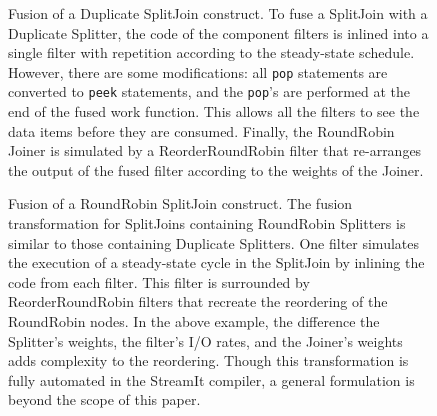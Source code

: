 \begin{figure}
\centering
{}
\caption{\protect\small Fusion of a Duplicate SplitJoin construct.  To
fuse a SplitJoin with a Duplicate Splitter, the code of the component
filters is inlined into a single filter with repetition according to
the steady-state schedule.  However, there are some modifications: all
{\tt pop} statements are converted to {\tt peek} statements, and the
{\tt pop}'s are performed at the end of the fused work function.  This
allows all the filters to see the data items before they are consumed.
Finally, the RoundRobin Joiner is simulated by a ReorderRoundRobin
filter that re-arranges the output of the fused filter according to
the weights of the Joiner.  \protect\label{fig:fuse-splitjoin1}}
\vspace{18pt}
\caption{\protect\small Fusion of a RoundRobin SplitJoin construct.
The fusion transformation for SplitJoins containing RoundRobin
Splitters is similar to those containing Duplicate Splitters.  One
filter simulates the execution of a steady-state cycle in the
SplitJoin by inlining the code from each filter.  This filter is
surrounded by ReorderRoundRobin filters that recreate the reordering of
the RoundRobin nodes.  In the above example, the difference the
Splitter's weights, the filter's I/O rates, and the Joiner's weights
adds complexity to the reordering.  Though this transformation is
fully automated in the StreamIt compiler, a general formulation is
beyond the scope of this paper.  \protect\label{fig:fuse-splitjoin2}}
\end{figure}

